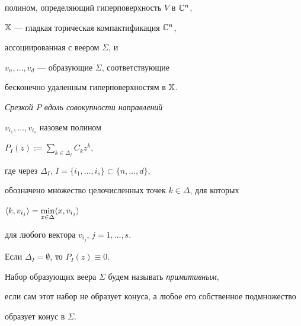 полином, определяющий гиперповерхность $V$ в $\Bbb C^n$,


$\Bbb X$ --- гладкая торическая компактификация $\Bbb C^n$,


ассоциированная с веером $\Sigma$, и


$v_n,\dotsc,v_{d}$ --- образующие $\Sigma$, соответствующие


бесконечно удаленным гиперповерхностям в $\Bbb X$.


{\it Срезкой $P$ вдоль совокупности направлений}


$v_{i_1},\dotsc, v_{i_s}$ назовем полином


$P_I(z):=\sum\limits_{k\in\Delta_I} C_k z^k$,


где через $\Delta_I$, $I=\{i_1,\dotsc,i_s\}\subset \{n,\dotsc,d\}$,


обозначено множество целочисленных точек $k\in \Delta$, для которых


$\langle k,v_{i_j}\rangle=\min\limits_{x\in \Delta}\langle x,v_{i_j}\rangle$


для любого вектора $v_{i_j}$, $j=1,\dotsc,s$.


Если $\Delta_I=\emptyset$, то $P_I(z)\equiv 0$.


Набор образующих веера $\Sigma$ будем называть {\it примитивным},


если сам этот набор не образует конуса, а любое его собственное подмножество


образует конус в $\Sigma$.





